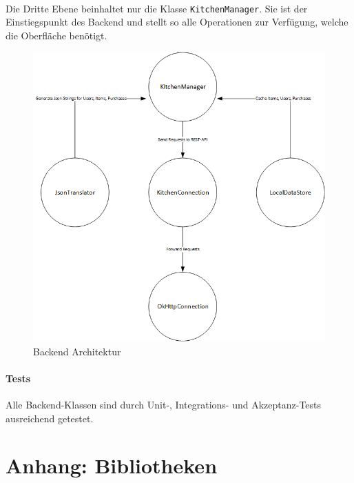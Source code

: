 \documentclass{scrartcl}
\begin{document}
			\paragraph*{}
			Die Dritte Ebene beinhaltet nur die Klasse \texttt{KitchenManager}. Sie ist der Einstiegspunkt des Backend und stellt so alle Operationen zur Verfügung, welche die Oberfläche benötigt.
		
			\begin{figure}[!h]
				\centering
				\label{backendArchitecture}
				\includegraphics[scale=0.5]{./figures/classStructure.png}
				\caption{Backend Architektur}
			\end{figure}

			\paragraph*{Tests}
			Alle Backend-Klassen sind durch Unit-, Integrations- und Akzeptanz-Tests ausreichend getestet.
	
	\section{Anhang: Bibliotheken} \label{bib}
		
\end{document}
